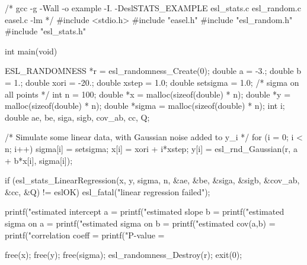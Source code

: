 \begin{cchunk}
/* gcc -g -Wall -o example -I. -DeslSTATS_EXAMPLE esl_stats.c esl_random.c easel.c -lm  */
#include <stdio.h>
#include "easel.h"
#include "esl_random.h"
#include "esl_stats.h"

int main(void)
{
  ESL_RANDOMNESS *r   = esl_randomness_Create(0);
  double a            = -3.;
  double b            = 1.;
  double xori         = -20.;
  double xstep        = 1.0;
  double setsigma     = 1.0;		/* sigma on all points */
  int    n            = 100;
  double *x           = malloc(sizeof(double) * n);
  double *y           = malloc(sizeof(double) * n);
  double *sigma       = malloc(sizeof(double) * n);
  int    i;
  double  ae, be, siga, sigb, cov_ab, cc, Q;
  
  /* Simulate some linear data, with Gaussian noise added to y_i */
  for (i = 0; i < n; i++) {
    sigma[i] = setsigma;
    x[i]     = xori + i*xstep;
    y[i]     = esl_rnd_Gaussian(r, a + b*x[i], sigma[i]);
  }
  
  if (esl_stats_LinearRegression(x, y, sigma, n, &ae, &be, &siga, &sigb, &cov_ab, &cc, &Q) != eslOK)
    esl_fatal("linear regression failed");

  printf("estimated intercept a = %
  printf("estimated slope b     = %
  printf("estimated sigma on a  = %
  printf("estimated sigma on b  = %
  printf("estimated cov(a,b)    = %
  printf("correlation coeff     = %
  printf("P-value               = %

  free(x);  free(y);  free(sigma); 
  esl_randomness_Destroy(r);
  exit(0);
}
\end{cchunk}
